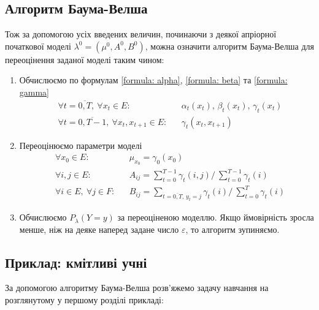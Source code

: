 \subsection{Алгоритм Баума-Велша}

Тож за допомогою усіх введених величин, починаючи з деякої апріорної початкової моделі $\lambda^0=(\mu^0,A^0,B^0)$, можна означити алгоритм Баума-Велша для переоцінення заданої моделі таким чином:

\begin{enumerate}
    \item Обчислюємо по формулам \eqref{formula: alpha}, \eqref{formula: beta} та \eqref{formula: gamma} 
    \begin{align*}
	    &\forall t=\overline{0,T}, \ \forall x_t \in E: && \alpha_t(x_t),\, \beta_t(x_t),\, \gamma_t(x_t) \\
        &\forall t=\overline{0,T-1}, \ \forall x_t,x_{t+1} \in E: && \gamma_t(x_t,x_{t+1})
    \end{align*}
    \item Переоцінюємо параметри моделі
    \begin{align*}
	    &\forall x_0 \in E: && \mu_{x_0}=\gamma_0(x_0) \\
        &\forall i,j \in E: && A_{ij}=\sum\limits_{t=0}^{T-1}\gamma_t(i,j) \biggl/ \ \sum\limits_{t=0}^{T-1}\gamma_t(i) \\
        &\forall i \in E, \ \forall j \in F: && B_{ij}=\sum\limits_{t=\overline{0,T},\, y_t=j}\gamma_t(i) \biggl/ \ \sum\limits_{t=0}^{T}\gamma_t(i)
    \end{align*}
    \item Обчислюємо $P_\lambda(Y=y)$ за переоціненою моделлю. Якщо ймовірність зросла менше, ніж на деяке наперед задане число $\varepsilon$, то алгоритм зупиняємо. 
\end{enumerate}

\subsection{Приклад: кмітливі учні}

За допомогою алгоритму Баума-Велша розв’яжемо задачу навчання на розглянутому у першому розділі прикладі:

